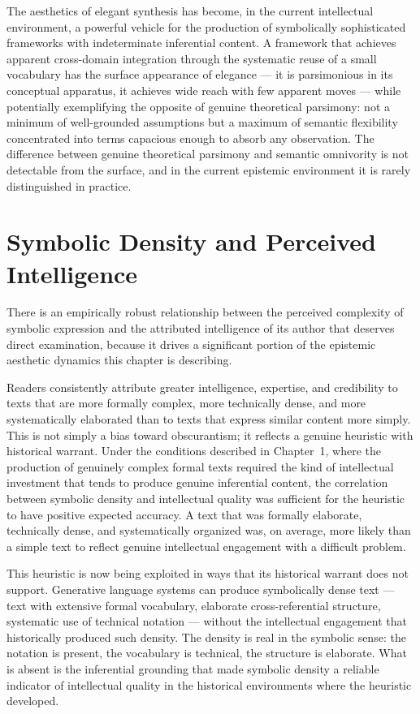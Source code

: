 \documentclass[12pt, openright, twoside]{book}
\begin{document}
The aesthetics of elegant synthesis has become, in the current
intellectual environment, a powerful vehicle for the production of
symbolically sophisticated frameworks with indeterminate inferential
content. A framework that achieves apparent cross-domain integration
through the systematic reuse of a small vocabulary has the surface
appearance of elegance --- it is parsimonious in its conceptual
apparatus, it achieves wide reach with few apparent moves --- while
potentially exemplifying the opposite of genuine theoretical parsimony:
not a minimum of well-grounded assumptions but a maximum of semantic
flexibility concentrated into terms capacious enough to absorb any
observation. The difference between genuine theoretical parsimony and
semantic omnivority is not detectable from the surface, and in the
current epistemic environment it is rarely distinguished in practice.

\section{Symbolic Density and Perceived Intelligence}

There is an empirically robust relationship between the perceived
complexity of symbolic expression and the attributed intelligence of
its author that deserves direct examination, because it drives a
significant portion of the epistemic aesthetic dynamics this chapter
is describing.

Readers consistently attribute greater intelligence, expertise, and
credibility to texts that are more formally complex, more technically
dense, and more systematically elaborated than to texts that express
similar content more simply. This is not simply a bias toward obscurantism;
it reflects a genuine heuristic with historical warrant. Under the
conditions described in Chapter~1, where the production of genuinely
complex formal texts required the kind of intellectual investment that
tends to produce genuine inferential content, the correlation between
symbolic density and intellectual quality was sufficient for the
heuristic to have positive expected accuracy. A text that was formally
elaborate, technically dense, and systematically organized was, on
average, more likely than a simple text to reflect genuine intellectual
engagement with a difficult problem.

This heuristic is now being exploited in ways that its historical
warrant does not support. Generative language systems can produce
symbolically dense text --- text with extensive formal vocabulary,
elaborate cross-referential structure, systematic use of technical
notation --- without the intellectual engagement that historically
produced such density. The density is real in the symbolic sense:
the notation is present, the vocabulary is technical, the structure
is elaborate. What is absent is the inferential grounding that made
symbolic density a reliable indicator of intellectual quality in
the historical environments where the heuristic developed.
\end{document}
